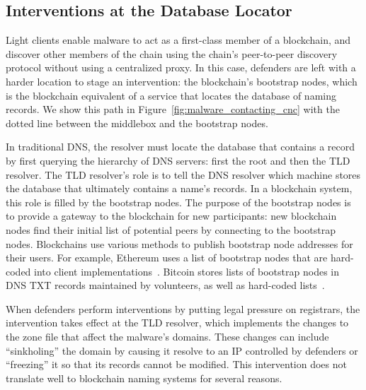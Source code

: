 \subsection{Interventions at the Database Locator}

Light clients enable malware to act as a first-class member 
of a blockchain, and discover other members of the chain 
using the chain's peer-to-peer discovery protocol without 
using a centralized proxy. In this case, 
defenders are left 
with a harder location to stage an intervention: the 
blockchain's bootstrap nodes, which is the blockchain 
equivalent of a service that locates the database of naming 
records. 
We show this path in 
Figure~\ref{fig:malware_contacting_cnc} with the dotted line 
between the middlebox and the bootstrap nodes. 

In traditional DNS, the resolver must locate the database 
that contains a record by first querying the hierarchy of DNS 
servers: first the root and then the TLD resolver. The TLD 
resolver's role is to tell the DNS resolver which machine 
stores the database that ultimately contains a name's 
records. In a blockchain system, this role is filled by the 
bootstrap nodes. The purpose of the bootstrap 
nodes is to provide a gateway to the blockchain for new 
participants: new blockchain nodes find their initial list of 
potential peers by connecting to the bootstrap nodes. 
Blockchains use various methods to publish bootstrap 
node addresses for their users. For 
example, Ethereum uses a list of bootstrap nodes 
that are hard-coded into 
client implementations~\cite{geth_bootstrap}. Bitcoin 
stores lists of bootstrap nodes in DNS TXT records maintained 
by volunteers, as 
well as hard-coded 
lists~\cite{bitcoin_bootstrap}.

When defenders perform interventions by putting legal 
pressure on registrars, the intervention takes effect at the 
TLD resolver, which implements the changes to the zone file 
that affect the malware's domains. These changes can include 
``sinkholing'' the domain by causing it resolve to an IP 
controlled by defenders or ``freezing'' it so that 
its records cannot be modified. This intervention does not 
translate well to blockchain naming systems for several 
reasons. 

